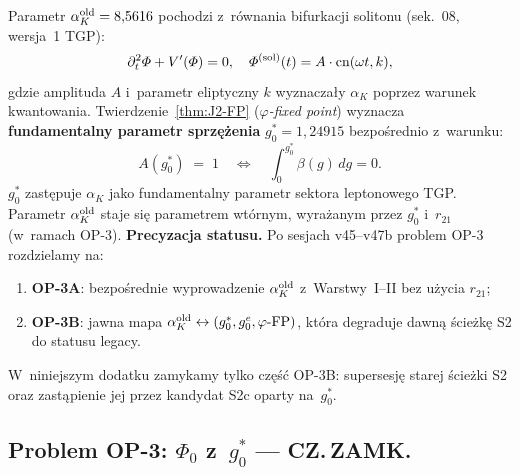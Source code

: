 \begin{remark}%
\label{rem:W-S2-superseded}
Parametr $\alpha_K^{\rm old} = 8{,}5616$ pochodzi z~r\'ownania
bifurkacji solitonu (sek.~08, wersja~1 TGP):
\begin{equation}
  \partial_t^2 \Phi + V'(\Phi) = 0,
  \quad
  \Phi^{(\rm sol)}(t) = A \cdot \mathrm{cn}(\omega t, k),
\end{equation}
gdzie amplituda $A$ i~parametr eliptyczny $k$ wyznacza\l{}y
$\alpha_K$ poprzez warunek kwantowania.
Twierdzenie~\ref{thm:J2-FP} (\textit{$\varphi$-fixed point})
wyznacza \textbf{fundamentalny parametr sprz\k{e}\.zenia}
$g_0^* = 1{,}24915$ bezpo\'{s}rednio z~warunku:
\begin{equation}
  A(g_0^*) \;=\; 1
  \quad\Longleftrightarrow\quad
  \int_0^{g_0^*} \beta(g)\,dg = 0.
\end{equation}
$g_0^*$ zast\k{e}puje $\alpha_K$ jako fundamentalny parametr
sektora leptonowego TGP.
Parametr $\alpha_K^{\rm old}$ staje si\k{e} parametrem
wt\'ornym, wyra\.zanym przez $g_0^*$ i~$r_{21}$
(w~ramach OP-3).
\textbf{Precyzacja statusu.}
Po sesjach v45--v47b problem OP-3 rozdzielamy na:
\begin{enumerate}[nosep,label=(\alph*)]
  \item \textbf{OP-3A}: bezpo\'srednie wyprowadzenie
    $\alpha_K^{\rm old}$ z~Warstwy~I--II bez u\.zycia $r_{21}$;
  \item \textbf{OP-3B}: jawna mapa
    $\alpha_K^{\rm old}\leftrightarrow(g_0^*,g_0^e,\varphi\text{-FP})$,
    kt\'ora degraduje dawn\k{a} \'scie\.zk\k{e} S2 do statusu legacy.
\end{enumerate}
W~niniejszym dodatku zamykamy tylko cz\k{e}\'s\'c OP-3B:
supersesj\k{e} starej \'scie\.zki S2 oraz zast\k{a}pienie jej
przez kandydat S2c oparty na~$g_0^*$.
\end{remark}

\subsection{Problem OP-3: $\Phi_0$ z~$g_0^*$ — CZ.\,ZAMK.}%
\label{app:W-OP3}

